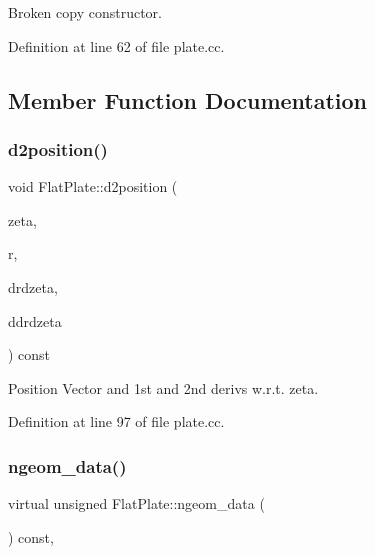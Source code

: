 Broken copy constructor. 



Definition at line 62 of file plate.\+cc.



\subsection{Member Function Documentation}
\mbox{\label{classFlatPlate_a2c14c32689795ee19c5dfeb0026c5ec0}} 
\subsubsection{\texorpdfstring{d2position()}{d2position()}}
{\footnotesize\ttfamily void Flat\+Plate\+::d2position (\begin{DoxyParamCaption}\item[{const Vector$<$ double $>$ \&}]{zeta,  }\item[{Vector$<$ double $>$ \&}]{r,  }\item[{Dense\+Matrix$<$ double $>$ \&}]{drdzeta,  }\item[{Rank\+Three\+Tensor$<$ double $>$ \&}]{ddrdzeta }\end{DoxyParamCaption}) const\hspace{0.3cm}{\ttfamily [inline]}}



Position Vector and 1st and 2nd derivs w.\+r.\+t. zeta. 



Definition at line 97 of file plate.\+cc.

\mbox{\label{classFlatPlate_ae7132e6fbbabf5543df743024b2ba9f7}} 
\subsubsection{\texorpdfstring{ngeom\+\_\+data()}{ngeom\_data()}}
{\footnotesize\ttfamily virtual unsigned Flat\+Plate\+::ngeom\+\_\+data (\begin{DoxyParamCaption}{ }\end{DoxyParamCaption}) const\hspace{0.3cm}{\ttfamily [inline]}, {\ttfamily [virtual]}}



